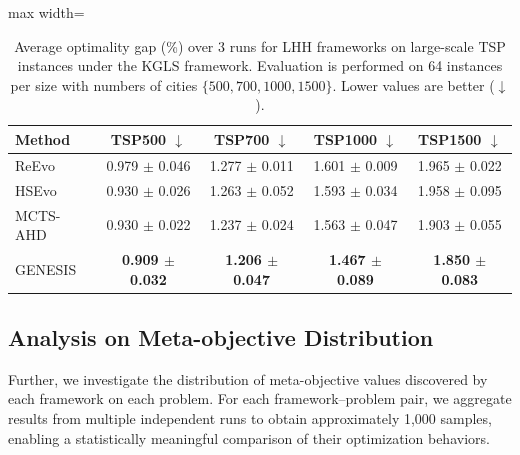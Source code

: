 \documentclass[sigconf,anonymous]{aamas}
\begin{document}
\begin{table}[!htbp]
\centering
\scriptsize
\setlength{\tabcolsep}{3pt}

\caption{Average optimality gap (\%) over 3 runs for LHH frameworks on large-scale TSP instances under the KGLS framework. Evaluation is performed on 64 instances per size with numbers of cities $\{500,700,1000,1500\}$. Lower values are better ($\downarrow$).}
\label{tab:gap_comparison}
\begin{adjustbox}{max width=\columnwidth}
\begin{tabular}{@{}lcccc@{}}
\toprule
Method 
& TSP500 $\downarrow$ 
& TSP700 $\downarrow$ 
& TSP1000 $\downarrow$ 
& TSP1500 $\downarrow$ \\
\midrule
ReEvo    & 0.979 $\pm$ 0.046 & 1.277 $\pm$ 0.011 & 1.601 $\pm$ 0.009 & 1.965 $\pm$ 0.022 \\
HSEvo    & 0.930 $\pm$ 0.026 & 1.263 $\pm$ 0.052 & 1.593 $\pm$ 0.034 & 1.958 $\pm$ 0.095 \\
MCTS-AHD & 0.930 $\pm$ 0.022 & 1.237 $\pm$ 0.024 & 1.563 $\pm$ 0.047 & 1.903 $\pm$ 0.055 \\
GENESIS  & \textbf{0.909 $\pm$ 0.032} & \textbf{1.206 $\pm$ 0.047} & \textbf{1.467 $\pm$ 0.089} & \textbf{1.850 $\pm$ 0.083} \\
\bottomrule
\end{tabular}
\end{adjustbox}
\end{table}




\subsection{Analysis on Meta-objective Distribution}

Further, we investigate the distribution of meta-objective values discovered by each framework on each problem. For each framework–problem pair, we aggregate results from multiple independent runs to obtain approximately 1,000 samples, enabling a statistically meaningful comparison of their optimization behaviors.
\end{document}
